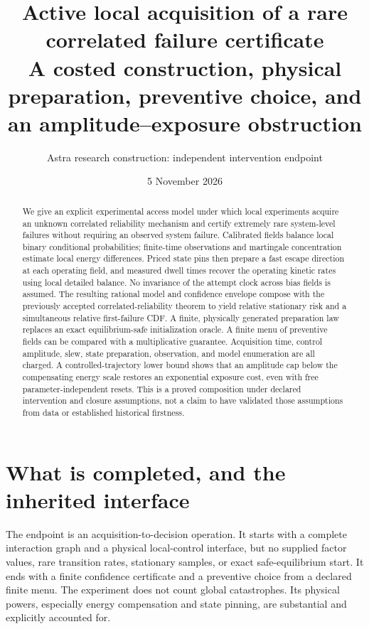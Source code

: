 \documentclass[11pt]{article}
\title{Active local acquisition of a rare correlated failure certificate\\\large A costed construction, physical preparation, preventive choice, and an amplitude--exposure obstruction}
\author{Astra research construction: independent intervention endpoint}
\date{5 November 2026}
\begin{document}
\maketitle
\begin{abstract}
We give an explicit experimental access model under which local experiments acquire an unknown correlated reliability mechanism and certify extremely rare system-level failures without requiring an observed system failure. Calibrated fields balance local binary conditional probabilities; finite-time observations and martingale concentration estimate local energy differences. Priced state pins then prepare a fast escape direction at each operating field, and measured dwell times recover the operating kinetic rates using local detailed balance. No invariance of the attempt clock across bias fields is assumed. The resulting rational model and confidence envelope compose with the previously accepted correlated-reliability theorem to yield relative stationary risk and a simultaneous relative first-failure CDF. A finite, physically generated preparation law replaces an exact equilibrium-safe initialization oracle. A finite menu of preventive fields can be compared with a multiplicative guarantee. Acquisition time, control amplitude, slew, state preparation, observation, and model enumeration are all charged. A controlled-trajectory lower bound shows that an amplitude cap below the compensating energy scale restores an exponential exposure cost, even with free parameter-independent resets. This is a proved composition under declared intervention and closure assumptions, not a claim to have validated those assumptions from data or established historical firstness.
\end{abstract}

\section{What is completed, and the inherited interface}
The endpoint is an acquisition-to-decision operation. It starts with a complete interaction graph and a physical local-control interface, but no supplied factor values, rare transition rates, stationary samples, or exact safe-equilibrium start. It ends with a finite confidence certificate and a preventive choice from a declared finite menu. The experiment does not count global catastrophes. Its physical powers, especially energy compensation and state pinning, are substantial and explicitly accounted for.
\end{document}
